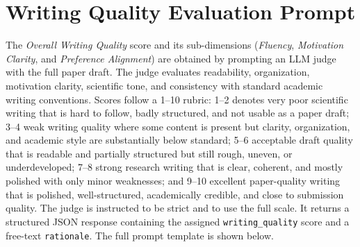 \documentclass{opendatalab}
\begin{document}
\section{Writing Quality Evaluation Prompt}
\label{app:writing_prompt}

The \textit{Overall Writing Quality} score and its sub-dimensions (\textit{Fluency}, \textit{Motivation Clarity}, and \textit{Preference Alignment}) are obtained by prompting an LLM judge with the full paper draft. The judge evaluates readability, organization, motivation clarity, scientific tone, and consistency with standard academic writing conventions. Scores follow a 1--10 rubric: 1--2 denotes very poor scientific writing that is hard to follow, badly structured, and not usable as a paper draft; 3--4 weak writing quality where some content is present but clarity, organization, and academic style are substantially below standard; 5--6 acceptable draft quality that is readable and partially structured but still rough, uneven, or underdeveloped; 7--8 strong research writing that is clear, coherent, and mostly polished with only minor weaknesses; and 9--10 excellent paper-quality writing that is polished, well-structured, academically credible, and close to submission quality. The judge is instructed to be strict and to use the full scale. It returns a structured JSON response containing the assigned \texttt{writing\_quality} score and a free-text \texttt{rationale}. The full prompt template is shown below.
\end{document}
